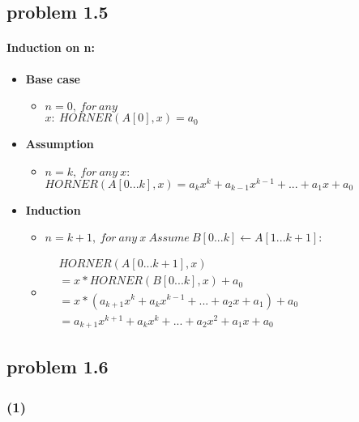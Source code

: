 \documentclass[11pt]{ctexart}
\begin{document}
	\subsection*{problem 1.5}
	\paragraph{Induction on n:}\label{Induction_one}
	\begin{itemize}
		\item \textbf{Base case}
		\begin{itemize}
			\item {$n=0, \ for\ any$\\
				$x:\ HORNER(A[0],x)=a_0$}
		\end{itemize}
		\item \textbf{Assumption}
		\begin{itemize}
			\item {$n=k,\ for\ any\ x:$\\
				$ HORNER(A[0...k],x)=a_k x^k+ a_{k-1}x^{k-1}+...+a_1x+a_0$}
		\end{itemize}
		\item \textbf{Induction}
		\begin{itemize}
			\item {
				$n=k+1,\ for\ any\ x\ Assume\ B[0...k]\gets A[1...k+1]: $
			}
			\item[] {
				$
				\begin{aligned}
				& HORNER(A[0...k+1],x)\\
				& =x*HORNER(B[0...k],x)+a_0\\
				& =x*(a_{k+1} x^k+ a_{k}x^{k-1}+...+a_2x+a_1)+a_0\\
				& =a_{k+1}x^{k+1}+a_{k}x^{k}+...+a_2x^2+a_1x+a_0
				\end{aligned}
				$
			}
		\end{itemize}
	\end{itemize}
\newpage
	\subsection*{problem 1.6}
	\subsubsection*{(1)}
\end{document}

